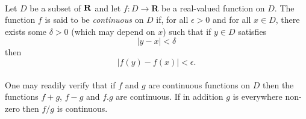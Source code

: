 \documentclass[a4paper,10pt]{report}
\begin{document}
        \paragraph{}
            Let $D$ be a subset of $\bf R$ and let
            $f \colon D \to \mathbf{R}$ be a real-valued function on
            $D$. The function $f$ is said to be \emph{continuous} on
            $D$ if, for all $\epsilon > 0$ and for all $x \in D$,
            there exists some $\delta > 0$ (which may depend on $x$)
            such that if $y \in D$ satisfies
            \[ |y - x| < \delta \]
            then
            \[ |f(y) - f(x)| < \epsilon. \]

        \paragraph{}
            One may readily verify that if $f$ and $g$ are continuous
            functions on $D$ then the functions $f+g$, $f-g$ and
            $f.g$ are continuous. If in addition $g$ is everywhere
            non-zero then $f/g$ is continuous.
\end{document}
